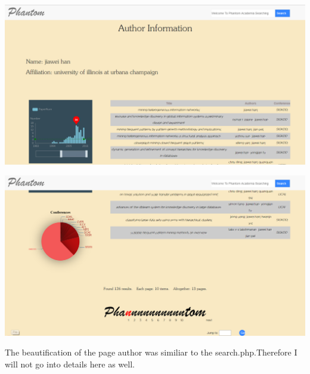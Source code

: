 \documentclass[10pt,twoside,a4paper,titlepage]{article}
\begin{document}
	 \hspace*{\fill} 
	\begin{flushleft}
		\includegraphics[width=1.0\textwidth]{cyf/author1.PNG}
		\newline
		
		\includegraphics[width=1.0\textwidth]{cyf/author2.PNG}
	\end{flushleft}

	The beautification of the page author was similiar to the search.php.Therefore I will not go into details here as well.
	
\end{document}
